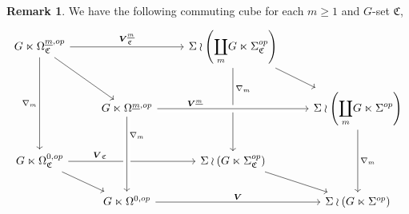 \documentclass[a4paper,10pt
,draft
]{article}%
\numberwithin{equation}{section}
\numberwithin{figure}{section}
\theoremstyle{definition} %
\newtheorem{remark}[equation]{Remark}%
\newcommand{\F}{\ensuremath{\mathcal F}}
\newcommand{\V}{\ensuremath{\mathcal V}}
\newcommand{\1}{\ensuremath{\mathbbm 1}}%
\begin{document}
\begin{remark}
      We have the following commuting cube for each $m \geq 1$ and $G$-set $\mathfrak C$,
      \begin{equation}
            \label{FCM_SQ_EQ}
            \begin{tikzcd}
                  G \ltimes \Omega_{\mathfrak C}^{\underline{m},op}
                  \arrow[rr, "\boldsymbol{V}_{\mathfrak C}^{\underline{m}}"] \arrow[dr] \arrow[dd, "\nabla_m"']
                  &&
                  \Sigma \wr \left( \displaystyle{\coprod_m} G \ltimes \Sigma_{\mathfrak C}^{op} \right)
                  \arrow[dr] \arrow[dd, "\nabla_m", near start]
                  \\
                  &
                  G \ltimes \Omega^{\underline{m},op}
                  \arrow[rr, crossing over, near start, "\boldsymbol{V}^{\underline{m}}"]
                  &&
                  \Sigma \wr \left( \displaystyle{\coprod_m} G \ltimes \Sigma^{op} \right)
                  \arrow[dd, "\nabla_m"]
                  \\
                  G \ltimes \Omega_{\mathfrak C}^{0,op}
                  \arrow[rr, near start, "\boldsymbol{V}_{\mathfrak C}"] \arrow[dr]
                  &&
                  \Sigma \wr \left( G \ltimes \Sigma_{\mathfrak C}^{op} \right)
                  \arrow[dr]
                  \\
                  &
                  G \ltimes \Omega^{0,op}
                  \arrow[rr, "\boldsymbol{V}"]
                  \arrow[uu, leftarrow, crossing over, "\nabla_m"', near end]
                  &&
                  \Sigma \wr \left( G \ltimes \Sigma^{op} \right)      
            \end{tikzcd}
      \end{equation}

\end{remark}
\end{document}
